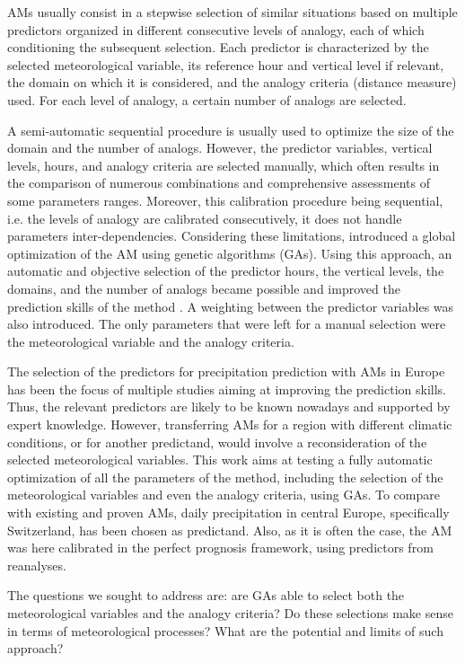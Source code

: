 \documentclass[draft]{agujournal2019}
\begin{document}
AMs usually consist in a stepwise selection of similar situations based on multiple predictors organized in different consecutive levels of analogy, each of which conditioning the subsequent selection. Each predictor is characterized by the selected meteorological variable, its reference hour and vertical level if relevant, the domain on which it is considered, and the analogy criteria (distance measure) used. For each level of analogy, a certain number of analogs are selected.

A semi-automatic sequential procedure \cite{Bontron2004, Radanovics2013, BenDaoud2016} is usually used to optimize the size of the domain and the number of analogs. However, the predictor variables, vertical levels, hours, and analogy criteria are selected manually, which often results in the comparison of numerous combinations and comprehensive assessments of some parameters ranges. Moreover, this calibration procedure being sequential, i.e. the levels of analogy are calibrated consecutively, it does not handle parameters inter-dependencies. Considering these limitations,  introduced a global optimization of the AM using genetic algorithms (GAs). Using this approach, an automatic and objective selection of the predictor hours, the vertical levels, the domains, and the number of analogs became possible and improved the prediction skills of the method \cite{Horton2018a}. A weighting between the predictor variables was also introduced. The only parameters that were left for a manual selection were the meteorological variable and the analogy criteria.

The selection of the predictors for precipitation prediction with AMs in Europe has been the focus of multiple studies aiming at improving the prediction skills. Thus, the relevant predictors are likely to be known nowadays and supported by expert knowledge. However, transferring AMs for a region with different climatic conditions, or for another predictand, would involve a reconsideration of the selected meteorological variables. This work aims at testing a fully automatic optimization of all the parameters of the method, including the selection of the meteorological variables and even the analogy criteria, using GAs. To compare with existing and proven AMs, daily precipitation in central Europe, specifically Switzerland, has been chosen as predictand. Also, as it is often the case, the AM was here calibrated in the perfect prognosis framework, using predictors from reanalyses.

The questions we sought to address are: are GAs able to select both the meteorological variables and the analogy criteria? Do these selections make sense in terms of meteorological processes? What are the potential and limits of such approach?
\end{document}
